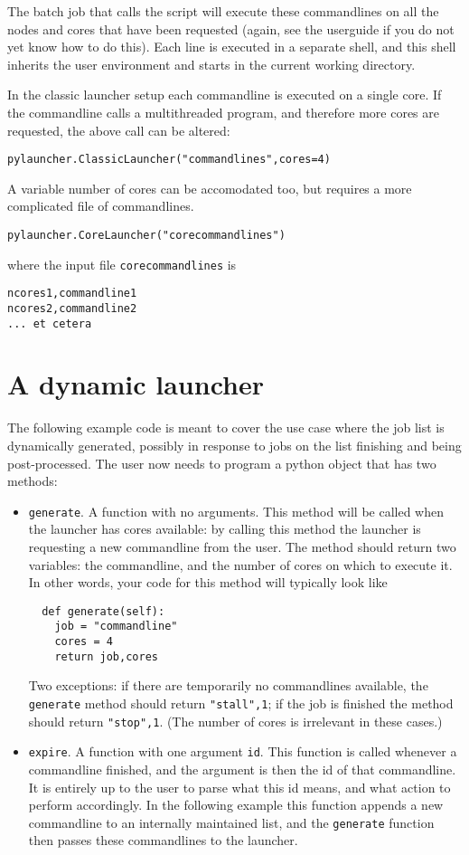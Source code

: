 \documentclass[11pt]{artikel3}
\newcommand\n[1]{{\tt #1}}
\begin{document}
The batch job that calls the script will execute these commandlines on
all the nodes and cores that have been requested (again, see the
userguide if you do not yet know how to do this). Each line is
executed in a separate shell, and this shell inherits the user
environment and starts in the current working directory.

In the classic launcher setup each commandline is executed on a single
core. If the commandline calls a multithreaded program, and therefore
more cores are requested, the above call can be altered:
\begin{verbatim}
pylauncher.ClassicLauncher("commandlines",cores=4)
\end{verbatim}

A variable number of cores can be accomodated too, but requires a more
complicated file of commandlines. 
\begin{verbatim}
pylauncher.CoreLauncher("corecommandlines")
\end{verbatim}
where the input file \n{corecommandlines} is
\begin{verbatim}
ncores1,commandline1
ncores2,commandline2
... et cetera
\end{verbatim}

\section*{A dynamic launcher}

The following example code is meant to cover the use case where the
job list is dynamically generated, possibly in response to jobs on the
list finishing and being post-processed. The user now needs to program
a python object that has two methods:
\begin{itemize}
\item \n{generate}. A function with no arguments. This method will be
  called when the launcher has cores available: by calling this method
  the launcher is requesting a new commandline from the user. The
  method should return two variables: the commandline, and the number
  of cores on which to execute it. In other words, your code for this
  method will typically look like
\begin{verbatim}
  def generate(self):
    job = "commandline"
    cores = 4
    return job,cores
\end{verbatim}
  Two exceptions: if there are temporarily no commandlines available,
  the \n{generate} method should return \n{"stall",1}; if the job is
  finished the method should return \n{"stop",1}. (The number of cores
  is irrelevant in these cases.)
\item \n{expire}. A function with one argument \n{id}. This function
  is called whenever a commandline finished, and the argument is then
  the id of that commandline. It is entirely up to the user to parse
  what this id means, and what action to perform
  accordingly. In the following example this function appends a new
  commandline to an internally maintained list, and the \n{generate}
  function then passes these commandlines to the launcher.
\end{itemize}
\end{document}
